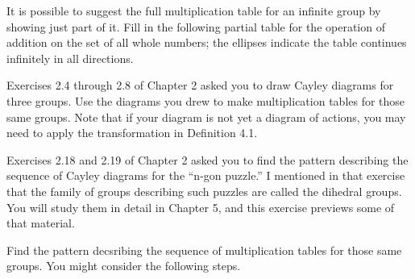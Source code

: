 \documentclass[11pt]{exam}
\begin{document}
\begin{questions}

	\question It is possible to suggest the full multiplication table for an infinite group by showing just part of it. Fill in the following partial table for the operation of addition on the set of all whole numbers; the ellipses indicate the table continues infinitely in all directions.

	\question Exercises 2.4 through 2.8 of Chapter 2 asked you to draw Cayley diagrams for three groups. Use the diagrams you drew to make multiplication tables for those same groups. Note that if your diagram is not yet a diagram of actions, you may need to apply the transformation in Definition 4.1.
	
	\question Exercises 2.18 and 2.19 of Chapter 2 asked you to find the pattern describing the sequence of Cayley diagrams for the ``n-gon puzzle.'' I mentioned in that exercise that the family of groups describing such puzzles are called the dihedral groups. You will study them in detail in Chapter 5, and this exercise previews some of that material.
	\par Find the pattern decsribing the sequence of multiplication tables for those same groups. You might consider the following steps.
	\begin{parts}

\end{parts}
\end{questions}
\end{document}
